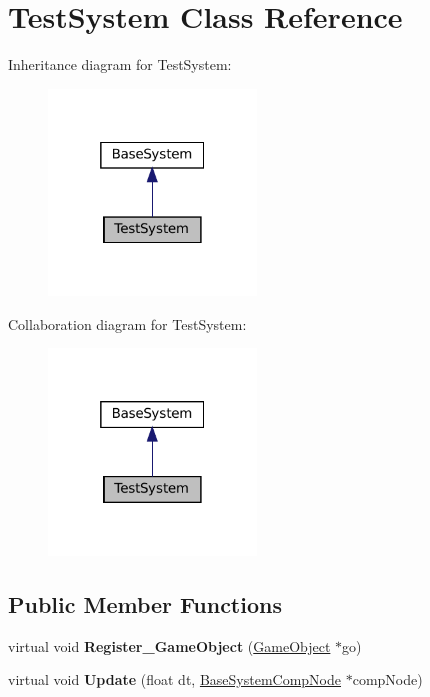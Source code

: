 \hypertarget{classTestSystem}{}\section{Test\+System Class Reference}
\label{classTestSystem}


Inheritance diagram for Test\+System\+:\nopagebreak
\begin{figure}[H]
\begin{center}
\leavevmode
\includegraphics[width=157pt]{classTestSystem__inherit__graph}
\end{center}
\end{figure}


Collaboration diagram for Test\+System\+:\nopagebreak
\begin{figure}[H]
\begin{center}
\leavevmode
\includegraphics[width=157pt]{classTestSystem__coll__graph}
\end{center}
\end{figure}
\subsection*{Public Member Functions}
\begin{DoxyCompactItemize}
\item 
\mbox{\label{classTestSystem_a73b7677422d0b780cca6ec9e7b31d653}} 
virtual void {\bfseries Register\+\_\+\+Game\+Object} (\hyperlink{classGameObject}{Game\+Object} $\ast$go)
\item 
\mbox{\label{classTestSystem_a3742fdf321596824bc2aac8a91a3ddb0}} 
virtual void {\bfseries Update} (float dt, \hyperlink{structBaseSystemCompNode}{Base\+System\+Comp\+Node} $\ast$comp\+Node)
\end{DoxyCompactItemize}

